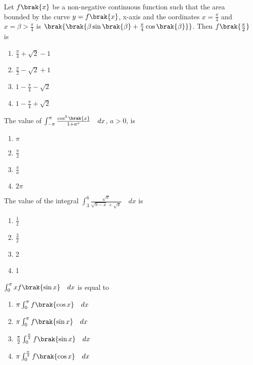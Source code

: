 	     \item 
		      Let $f\brak{x}$ be a non-negative continuous function such that the area bounded by the curve $y=f\brak{x}$, x-axis and the oordinates $x=\frac{\pi}{4}$ and $x=\beta>\frac{\pi}{4}$ is $\brak{\brak{\beta \sin\brak{\beta}+\frac{\pi}{4}\cos\brak{\beta}}}$. Then $f\brak{\frac{\pi}{2}}$ is
		     \hfill {}
		     \begin{enumerate}
		            \item $\frac{\pi}{4}+\sqrt{2}-1$
		            \item $\frac{\pi}{2}-\sqrt{2}+1$
		            \item $1-\frac{\pi}{4}-\sqrt{2}$
		            \item $1-\frac{\pi}{4}+\sqrt{2}$
		     \end{enumerate}
	     \item 
		      The value of $\int_{-\pi}^{\pi} \frac{\cos^{2}\brak{x}}{1+a^{x}} \quad dx$, $a>0$, is
		     \hfill {}
		     \begin{enumerate}
		           \item $\pi$
		           \item $\frac{\pi}{2}$
		           \item $\frac{\pi}{a}$
		           \item $2\pi$
		     \end{enumerate}
	     \item 
		     The value of the integral $\int_{3}^{6} \frac{\sqrt{x}}{\sqrt{9-x}+\sqrt{x}} \quad dx$ is \quad \quad \quad
       \quad \quad
		     \hfill {} 
		    \begin{enumerate}
		     
		          \item $\frac{1}{2}$
		          \item $\frac{3}{2}$
		          \item 2
		          \item 1
		    \end{enumerate}
	     \item 
		     $\int_{0}^{\pi} xf\brak{\sin x} \quad dx$ is equal to 
		    \hfill {}
		    \begin{enumerate}
		    
		         \item $\pi \int_{0}^{\pi} f\brak{\cos x} \quad dx$
		         \item $\pi \int_{0}^{\pi} f\brak{\sin x} \quad dx$
		         \item $\frac{\pi}{2} \int_{0}^{\frac{\pi}{2}} f\brak{\sin x} \quad dx$
		         \item $\pi \int_{0}^{\frac{\pi}{2}} f\brak{\cos x} \quad dx$
		    \end{enumerate}
